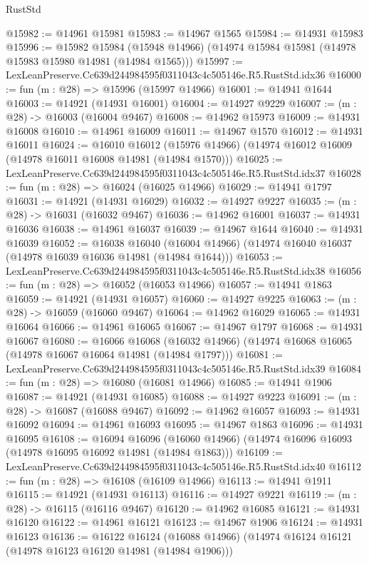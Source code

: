 \begin{lexlean}{RustStd}
\begin{coremodule}
@15982 := @14961 @15981
@15983 := @14967 @1565
@15984 := @14931 @15983
@15996 := @15982
    @15984
    (@15948 @14966)
    (@14974 @15984 @15981 (@14978 @15983 @15980 @14981 (@14984 @1565)))
@15997 := LexLeanPreserve.Cc639d244984595f0311043c4c505146e.R5.RustStd.idx36
@16000 := fun (m : @28) => @15996 (@15997 @14966)
@16001 := @14941 @1644
@16003 := @14921 (@14931 @16001)
@16004 := @14927 @9229
@16007 := (m : @28) -> @16003 (@16004 @9467)
@16008 := @14962 @15973
@16009 := @14931 @16008
@16010 := @14961 @16009
@16011 := @14967 @1570
@16012 := @14931 @16011
@16024 := @16010
    @16012
    (@15976 @14966)
    (@14974 @16012 @16009 (@14978 @16011 @16008 @14981 (@14984 @1570)))
@16025 := LexLeanPreserve.Cc639d244984595f0311043c4c505146e.R5.RustStd.idx37
@16028 := fun (m : @28) => @16024 (@16025 @14966)
@16029 := @14941 @1797
@16031 := @14921 (@14931 @16029)
@16032 := @14927 @9227
@16035 := (m : @28) -> @16031 (@16032 @9467)
@16036 := @14962 @16001
@16037 := @14931 @16036
@16038 := @14961 @16037
@16039 := @14967 @1644
@16040 := @14931 @16039
@16052 := @16038
    @16040
    (@16004 @14966)
    (@14974 @16040 @16037 (@14978 @16039 @16036 @14981 (@14984 @1644)))
@16053 := LexLeanPreserve.Cc639d244984595f0311043c4c505146e.R5.RustStd.idx38
@16056 := fun (m : @28) => @16052 (@16053 @14966)
@16057 := @14941 @1863
@16059 := @14921 (@14931 @16057)
@16060 := @14927 @9225
@16063 := (m : @28) -> @16059 (@16060 @9467)
@16064 := @14962 @16029
@16065 := @14931 @16064
@16066 := @14961 @16065
@16067 := @14967 @1797
@16068 := @14931 @16067
@16080 := @16066
    @16068
    (@16032 @14966)
    (@14974 @16068 @16065 (@14978 @16067 @16064 @14981 (@14984 @1797)))
@16081 := LexLeanPreserve.Cc639d244984595f0311043c4c505146e.R5.RustStd.idx39
@16084 := fun (m : @28) => @16080 (@16081 @14966)
@16085 := @14941 @1906
@16087 := @14921 (@14931 @16085)
@16088 := @14927 @9223
@16091 := (m : @28) -> @16087 (@16088 @9467)
@16092 := @14962 @16057
@16093 := @14931 @16092
@16094 := @14961 @16093
@16095 := @14967 @1863
@16096 := @14931 @16095
@16108 := @16094
    @16096
    (@16060 @14966)
    (@14974 @16096 @16093 (@14978 @16095 @16092 @14981 (@14984 @1863)))
@16109 := LexLeanPreserve.Cc639d244984595f0311043c4c505146e.R5.RustStd.idx40
@16112 := fun (m : @28) => @16108 (@16109 @14966)
@16113 := @14941 @1911
@16115 := @14921 (@14931 @16113)
@16116 := @14927 @9221
@16119 := (m : @28) -> @16115 (@16116 @9467)
@16120 := @14962 @16085
@16121 := @14931 @16120
@16122 := @14961 @16121
@16123 := @14967 @1906
@16124 := @14931 @16123
@16136 := @16122
    @16124
    (@16088 @14966)
    (@14974 @16124 @16121 (@14978 @16123 @16120 @14981 (@14984 @1906)))

\end{coremodule}
\end{lexlean}

